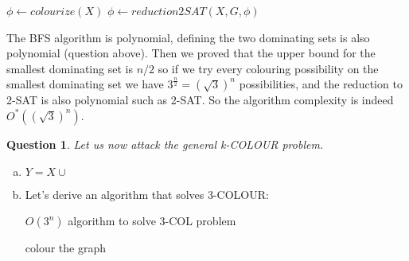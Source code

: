 \documentclass{article}
\newtheorem{Question}[theorem]{Question}
\begin{document}
\begin{enumerate}[(a)]
\begin{algorithm}[H]
\begin{algorithmic}
            \EndIf
            \State $\phi \gets colourize(X)$
            \State $\phi \gets reduction2SAT(X, G, \phi)$
        \end{algorithmic}
    \end{algorithm}
    The BFS algorithm is polynomial, defining the two dominating sets is also polynomial (question above). Then we proved that the upper bound for the smallest dominating set is $n/2$ so if we try every colouring possibility on the smallest dominating set we have $3^{\frac{n}{2}} = (\sqrt{3})^n$ possibilities, and the reduction to 2-SAT is also polynomial such as 2-SAT. So the algorithm complexity is indeed $O^*((\sqrt{3})^n)$.
\end{enumerate}
\begin{Question}
    Let us now attack the general k-COLOUR problem.
\end{Question}
\begin{enumerate}[(a)]
    \item $Y = X \cup $
    \item Let's derive an algorithm that solves 3-COLOUR:
    \begin{algorithm}[H]
        \caption{$O(3^n)$ algorithm to solve 3-COL problem}    
        \begin{algorithmic}
            \State colour the graph
        \end{algorithmic}
    \end{algorithm}
\end{enumerate}
\end{document}
